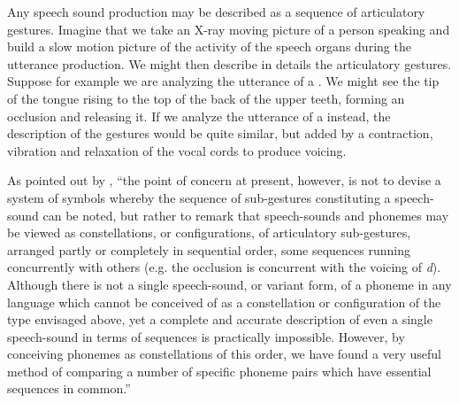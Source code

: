 Any speech sound production may be described as a sequence of articulatory gestures. Imagine that we take an X-ray moving picture of a person speaking and build a slow motion picture of the activity of the speech organs during the utterance production. We might then describe in details the articulatory gestures. Suppose for example we are analyzing the utterance of a \textipa{[t]}. We might see the tip of the tongue rising to the top of the back of the upper teeth, forming an occlusion and releasing it. If we analyze the utterance of a \textipa{[d]} instead, the description of the gestures would be quite similar, but added by a contraction, vibration and relaxation of the vocal cords to produce voicing.

As pointed out by \cite{zipf1949}, ``the point of concern at present, however, is not to devise a system of symbols whereby the sequence of sub-gestures constituting a speech-sound can be noted, but rather to remark that speech-sounds and phonemes may be viewed as constellations, or configurations, of articulatory sub-gestures, arranged partly or completely in sequential order, some sequences running concurrently with others (e.g. the occlusion is concurrent with the voicing of \textit{d}). Although there is not a single speech-sound, or variant form, of a phoneme in any language which cannot be conceived of as a constellation or configuration of the type envisaged above, yet a complete and accurate description of even a single speech-sound in terms of sequences is practically impossible. However, by conceiving phonemes as constellations of this order, we have found a very useful method of comparing a number of specific phoneme pairs which have essential sequences in common.''

